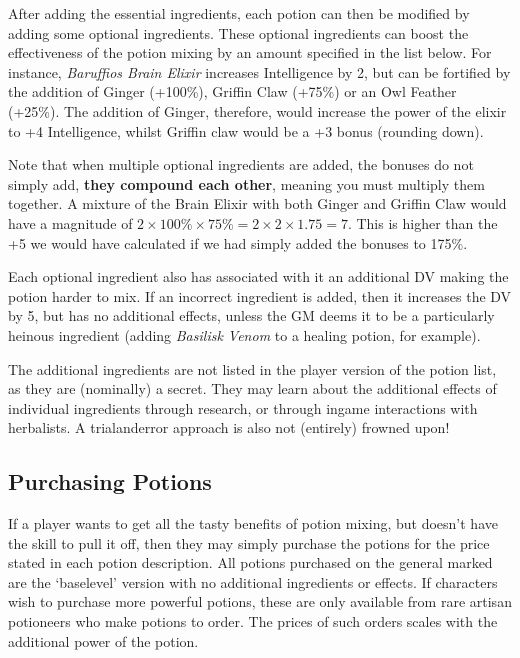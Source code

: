 After adding the essential ingredients, each potion can then be modified by adding some optional ingredients. These optional ingredients can boost the effectiveness of the potion mixing by an amount specified in the list below. For instance, {\it Baruffio\apos{}s Brain Elixir} increases Intelligence by 2, but can be fortified by the addition of Ginger (+100\%), Griffin Claw (+75\%) or an Owl Feather (+25\%). The addition of Ginger, therefore, would increase the power of the elixir to +4 Intelligence, whilst Griffin claw would be a +3 bonus (rounding down). 

Note that when multiple optional ingredients are added, the bonuses do not simply add, {\bf they compound each other}, meaning you must multiply them together. A mixture of the Brain Elixir with both Ginger and Griffin Claw would have a magnitude of $2 \times 100\% \times 75\% = 2 \times 2 \times 1.75 = 7$. This is higher than the +5 we would have calculated if we had simply added the bonuses to 175\%.

Each optional ingredient also has associated with it an additional DV \minus{} making the potion harder to mix. If an incorrect ingredient is added, then it increases the DV by 5, but has no additional effects, unless the GM deems it to be a particularly heinous ingredient (adding {\it Basilisk Venom} to a healing potion, for example). 

The additional ingredients are not listed in the player version of the potion list, as they are (nominally) a secret. They may learn about the additional effects of individual ingredients through research, or through in\minus{}game interactions with herbalists. A trial\minus{}and\minus{}error approach is also not (entirely) frowned upon!

\subsection{Purchasing Potions}

If a player wants to get all the tasty benefits of potion mixing, but doesn't have the skill to pull it off, then they may simply purchase the potions for the price stated in each potion description. All potions purchased on the general marked are the `base\minus{}level' version with no additional ingredients or effects. If characters wish to purchase more powerful potions, these are only available from rare artisan potioneers who make potions to order. The prices of such orders scales with the additional power of the potion. 

